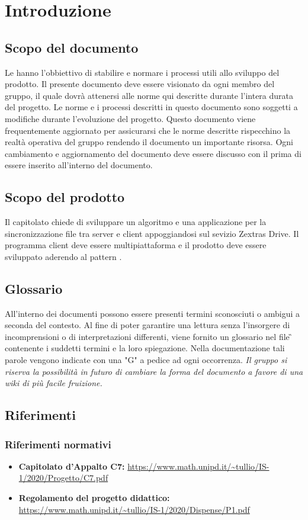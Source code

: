 \section{Introduzione}
\subsection{Scopo del documento}
Le \NdP{} hanno l'obbiettivo di stabilire e normare i processi utili allo sviluppo del prodotto.
Il presente documento deve essere visionato da ogni membro del gruppo, il quale dovrà attenersi alle norme qui descritte durante l'intera durata del progetto.
Le norme e i processi descritti in questo documento sono soggetti a modifiche durante l'evoluzione del progetto.
Questo documento viene frequentemente aggiornato per assicurarsi che le norme descritte rispecchino la realtà operativa del gruppo rendendo il documento un importante risorsa.
Ogni cambiamento e aggiornamento del documento deve essere discusso con il \RdP{} prima di essere inserito all'interno del documento.
\subsection{Scopo del prodotto}
Il capitolato chiede di sviluppare un algoritmo e una applicazione per la sincronizzazione file tra server e client appoggiandosi sul sevizio Zextras Drive.
Il programma client deve essere multipiattaforma e il prodotto deve essere sviluppato aderendo al pattern .
\subsection{Glossario}
All'interno dei documenti possono essere presenti termini sconosciuti o ambigui a seconda del contesto. Al fine di poter garantire una lettura senza l'insorgere di incomprensioni o di interpretazioni differenti, viene fornito un glossario nel file \G{} contenente i suddetti termini e la loro spiegazione. Nella documentazione tali parole vengono indicate con una "G" a pedice ad ogni occorrenza. \newline
\textit{Il gruppo si riserva la possibilità in futuro di cambiare la forma del documento a favore di una wiki di più facile fruizione.}
\subsection{Riferimenti}
\subsubsection{Riferimenti normativi}
\begin{itemize}
	\item \textbf{Capitolato d'Appalto C7:} \url{https://www.math.unipd.it/~tullio/IS-1/2020/Progetto/C7.pdf}
	\item \textbf{Regolamento del progetto didattico:} \url{https://www.math.unipd.it/~tullio/IS-1/2020/Dispense/P1.pdf}
\end{itemize}
